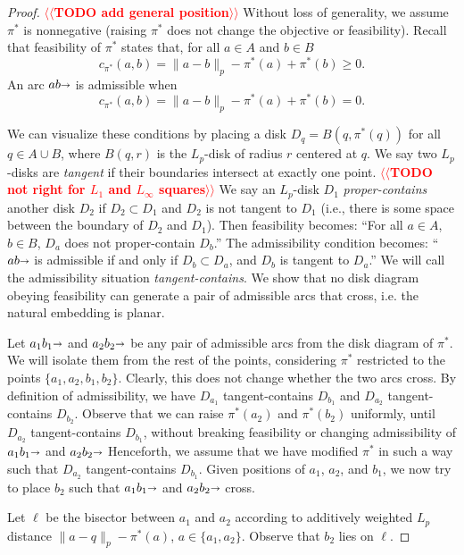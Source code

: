 \documentclass[11pt]{article}
\makeatletter
\def\norm#1{\mathopen\| #1 \mathclose\|}	%
\def\arcto{\mathord\shortrightarrow}
\def\arc#1#2{#1\arcto#2}
\theoremstyle{plain}
\numberwithin{figure}{section}
\def\n@te#1{\textsf{\boldmath \textbf{$\langle\!\langle$#1$\rangle\!\rangle$}}\leavevmode}
\def\note#1{\textcolor{red}{\n@te{#1}}}
\makeatother
\begin{document}
\begin{proof}
\note{TODO add general position} %
Without loss of generality, we assume $\pi^*$ is nonnegative (raising $\pi^*$
does not change the objective or feasibility).
Recall that feasibility of $\pi^*$ states that, for all $a \in A$ and $b \in B$
\[
	c_{\pi^*}(a, b) = \norm{a-b}_p - \pi^*(a) + \pi^*(b) \geq 0.
\]
An arc $\arc{ab}$ is admissible when 
\[
	c_{\pi^*}(a, b) = \norm{a-b}_p - \pi^*(a) + \pi^*(b) = 0.
\]

We can visualize these conditions by placing a disk $D_q = B(q, \pi^*(q))$ for
all $q \in A \cup B$, where $B(q, r)$ is the $L_p$-disk of radius $r$ centered
at $q$.
We say two $L_p$-disks are \emph{tangent} if their boundaries intersect at
exactly one point.
\note{TODO not right for $L_1$ and $L_\infty$ squares} %
We say an $L_p$-disk $D_1$ \emph{proper-contains} another disk $D_2$ if 
$D_2 \subset D_1$ and $D_2$ is not tangent to $D_1$
(i.e., there is some space between the boundary of $D_2$ and $D_1$).
Then feasibility becomes: ``For all $a \in A$, $b \in B$, $D_a$ does not
proper-contain $D_b$.''
The admissibility condition becomes: ``$\arc{ab}$ is admissible if and only if
$D_b \subset D_a$, and $D_b$ is tangent to $D_a$.''
We will call the admissibility situation \emph{tangent-contains}.
We show that no disk diagram obeying feasibility can generate a pair of
admissible arcs that cross, i.e. the natural embedding is planar.

Let $\arc{a_1 b_1}$ and $\arc{a_2 b_2}$ be any pair of admissible arcs from the
disk diagram of $\pi^*$.
We will isolate them from the rest of the points, considering $\pi^*$
restricted to the points $\{a_1, a_2, b_1, b_2\}$.
Clearly, this does not change whether the two arcs cross.
By definition of admissibility, we have $D_{a_1}$ tangent-contains $D_{b_1}$
and $D_{a_2}$ tangent-contains $D_{b_2}$.
Observe that we can raise $\pi^*(a_2)$ and $\pi^*(b_2)$ uniformly, until
$D_{a_2}$ tangent-contains $D_{b_1}$, without breaking feasibility or changing
admissibility of $\arc{a_1 b_1}$ and $\arc{a_2 b_2}$
Henceforth, we assume that we have modified $\pi^*$ in such a way such that 
$D_{a_2}$ tangent-contains $D_{b_1}$.
Given positions of $a_1$, $a_2$, and $b_1$, we now try to place $b_2$ such that 
$\arc{a_1 b_1}$ and $\arc{a_2 b_2}$ cross.

Let $\ell$ be the bisector between $a_1$ and $a_2$ according to additively
weighted $L_p$ distance $\norm{a - q}_p - \pi^*(a)$, $a \in \{a_1, a_2\}$.
Observe that $b_2$ lies on $\ell$.



\end{proof}
\end{document}
